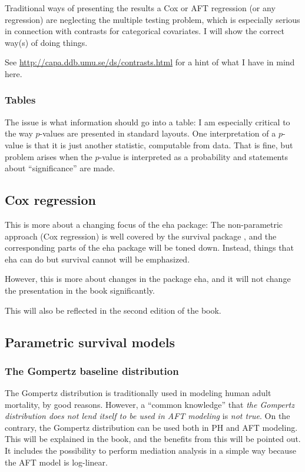 \documentclass[a4paper,11pt]{article}
\begin{document}
Traditional ways of presenting the results a Cox or AFT regression (or any 
regression) are neglecting the multiple testing problem, which is especially 
serious in connection with contrasts for categorical covariates. I will show 
the correct way(s) of doing things.

See \url{http://capa.ddb.umu.se/ds/contrasts.html} for a hint of what I have in 
mind here.

\subsubsection{Tables}

The issue is what information should go into a table: I am especially
critical to the way $p$-values are presented in standard layouts.  One
interpretation of a $p$-value is that it is just another statistic,
computable from data. That is fine, but problem arises when the $p$-value is
interpreted as a probability and statements about ``significance'' are made.

\subsection{Cox regression}

This is more about a changing focus of the eha package: The non-parametric
approach (Cox regression) is well covered by the survival package
\citep{survival}, and the corresponding parts of the eha package will be
toned down. Instead, things that eha can do but survival cannot will be emphasized.

However, this is more about changes in the package eha, and it will not change the
presentation in the book significantly.



This will also be reflected in the second edition of the book. 

\subsection{Parametric survival models}


\subsubsection{The Gompertz baseline distribution}

The Gompertz distribution is traditionally used in modeling human adult
mortality, by good reasons. However, a ``common knowledge'' that \emph{the
Gompertz distribution does not lend itself to be used in AFT modeling} 
\citep[p. 285]{klekle} is
\emph{not true}. On the contrary, the Gompertz distribution can be used both in PH
and AFT modeling. This will be explained in the book, and the benefits from
this will be pointed out. It includes the possibility to perform mediation
analysis in a simple way because the AFT model is log-linear.
\end{document}
